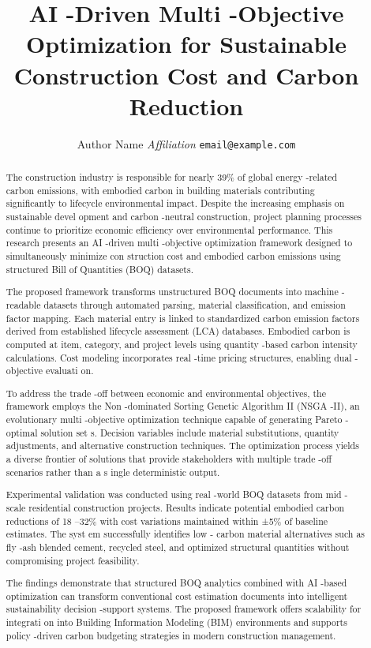 \documentclass[10pt,twocolumn]{article}
\title{AI -Driven Multi -Objective Optimization for Sustainable Construction Cost and Carbon Reduction}
\author{Author Name \quad \textit{Affiliation} \quad \texttt{email@example.com}}
\date{}
\makeatletter
\renewcommand{\maketitle}{%
  \twocolumn[%
    \begin{@twocolumnfalse}
      \centering
      {\LARGE \bfseries \@title \par}\vspace{0.5em}
      {\normalsize \@author \par}\vspace{0.3em}
      {\small \@date \par}\vspace{1.2em}
    \end{@twocolumnfalse}
  ]%
}
\makeatother
\begin{document}
\maketitle

\begin{abstract}
\boldmath
The construction industry is responsible for nearly 39\% of global energy -related carbon emissions,
with embodied carbon in building materials contributing significantly to lifecycle environmental 
impact. Despite the increasing emphasis on sustainable devel opment and carbon -neutral 
construction, project planning processes continue to prioritize economic efficiency over 
environmental performance. This research presents an AI -driven multi -objective optimization 
framework designed to simultaneously minimize con struction cost and embodied carbon emissions 
using structured Bill of Quantities (BOQ) datasets.  
 
The proposed framework transforms unstructured BOQ documents into machine -readable datasets 
through automated parsing, material classification, and emission factor mapping. Each material entry 
is linked to standardized carbon emission factors derived from established lifecycle assessment (LCA) 
databases. Embodied carbon is computed at item, category, and project levels using quantity -based 
carbon intensity calculations. Cost modeling incorporates real -time pricing structures, enabling dual -
objective evaluati on. 
 
To address the trade -off between economic and environmental objectives, the framework employs 
the Non -dominated Sorting Genetic Algorithm II (NSGA -II), an evolutionary multi -objective 
optimization technique capable of generating Pareto -optimal solution set s. Decision variables include 
material substitutions, quantity adjustments, and alternative construction techniques. The 
optimization process yields a diverse frontier of solutions that provide stakeholders with multiple 
trade -off scenarios rather than a s ingle deterministic output.  
 
Experimental validation was conducted using real -world BOQ datasets from mid -scale residential 
construction projects. Results indicate potential embodied carbon reductions of 18 –32\% with cost 
variations maintained within ±5\% of baseline estimates. The syst em successfully identifies low -
carbon material alternatives such as fly -ash blended cement, recycled steel, and optimized structural 
quantities without compromising project feasibility.  
 
The findings demonstrate that structured BOQ analytics combined with AI -based optimization can 
transform conventional cost estimation documents into intelligent sustainability decision -support 
systems. The proposed framework offers scalability for integrati on into Building Information 
Modeling (BIM) environments and supports policy -driven carbon budgeting strategies in modern 
construction management.
\end{abstract}
\end{document}
